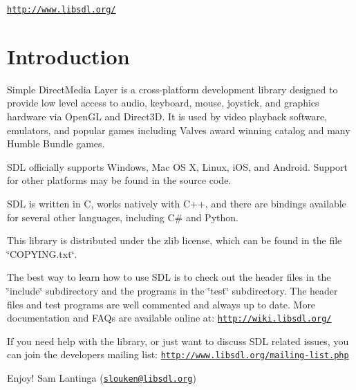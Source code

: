 \href{http://www.libsdl.org/}{\tt http\+://www.\+libsdl.\+org/}\hypertarget{index_intro_sec}{}\section{Introduction}\label{index_intro_sec}
Simple Direct\+Media Layer is a cross-\/platform development library designed to provide low level access to audio, keyboard, mouse, joystick, and graphics hardware via Open\+GL and Direct3D. It is used by video playback software, emulators, and popular games including Valve\textquotesingle{}s award winning catalog and many Humble Bundle games.

S\+DL officially supports Windows, Mac OS X, Linux, i\+OS, and Android. Support for other platforms may be found in the source code.

S\+DL is written in C, works natively with C++, and there are bindings available for several other languages, including C\# and Python.

This library is distributed under the zlib license, which can be found in the file \char`\"{}\+C\+O\+P\+Y\+I\+N\+G.\+txt\char`\"{}.

The best way to learn how to use S\+DL is to check out the header files in the \char`\"{}include\char`\"{} subdirectory and the programs in the \char`\"{}test\char`\"{} subdirectory. The header files and test programs are well commented and always up to date. More documentation and F\+A\+Qs are available online at\+: \href{http://wiki.libsdl.org/}{\tt http\+://wiki.\+libsdl.\+org/}

If you need help with the library, or just want to discuss S\+DL related issues, you can join the developers mailing list\+: \href{http://www.libsdl.org/mailing-list.php}{\tt http\+://www.\+libsdl.\+org/mailing-\/list.\+php}

Enjoy! Sam Lantinga (\href{mailto:slouken@libsdl.org}{\tt slouken@libsdl.\+org}) 